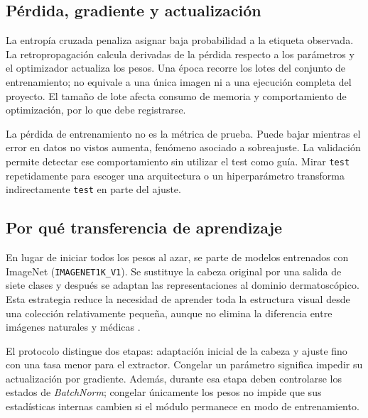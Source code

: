 \subsection{Pérdida, gradiente y actualización}
La entropía cruzada penaliza asignar baja probabilidad a la etiqueta observada. La retropropagación calcula derivadas de la pérdida respecto a los parámetros y el optimizador actualiza los pesos. Una época recorre los lotes del conjunto de entrenamiento; no equivale a una única imagen ni a una ejecución completa del proyecto. El tamaño de lote afecta consumo de memoria y comportamiento de optimización, por lo que debe registrarse.

La pérdida de entrenamiento no es la métrica de prueba. Puede bajar mientras el error en datos no vistos aumenta, fenómeno asociado a sobreajuste. La validación permite detectar ese comportamiento sin utilizar el test como guía. Mirar \texttt{test} repetidamente para escoger una arquitectura o un hiperparámetro transforma indirectamente \texttt{test} en parte del ajuste.

\subsection{Por qué transferencia de aprendizaje}
En lugar de iniciar todos los pesos al azar, se parte de modelos entrenados con ImageNet (\texttt{IMAGENET1K\_V1}). Se sustituye la cabeza original por una salida de siete clases y después se adaptan las representaciones al dominio dermatoscópico. Esta estrategia reduce la necesidad de aprender toda la estructura visual desde una colección relativamente pequeña, aunque no elimina la diferencia entre imágenes naturales y médicas \cite{pan2010}.

El protocolo distingue dos etapas: adaptación inicial de la cabeza y ajuste fino con una tasa menor para el extractor. Congelar un parámetro significa impedir su actualización por gradiente. Además, durante esa etapa deben controlarse los estados de \textit{BatchNorm}; congelar únicamente los pesos no impide que sus estadísticas internas cambien si el módulo permanece en modo de entrenamiento.

